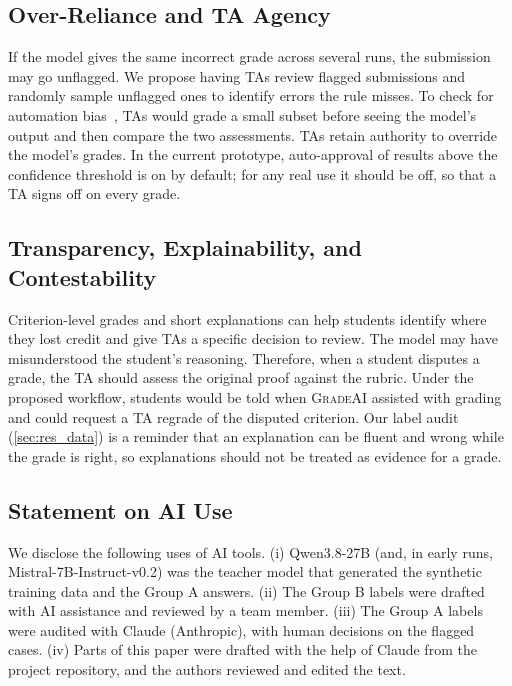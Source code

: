 \documentclass[11pt,a4paper]{article}
\newif\ifdraft
\newcommand{\todo}[2]{%
  \ifdraft\textcolor{red}{\textbf{[TODO #1:} #2\textbf{]}}\fi}
\newcommand{\gradeai}{\textsc{GradeAI}}
\theoremstyle{definition}
\begin{document}
\subsection{Over-Reliance and TA Agency}
If the model gives the same incorrect grade across several runs, the submission may go unflagged. We propose having TAs review flagged submissions and randomly sample unflagged ones to identify errors the rule misses. To check for automation bias~\cite{parasuraman2010complacency}, TAs would grade a small subset before seeing the model's output and then compare the two assessments. TAs retain authority to override the model's grades. In the current prototype, auto-approval of results above the confidence threshold is on by default; for any real use it should be off, so that a TA signs off on every grade.

\subsection{Transparency, Explainability, and Contestability}
Criterion-level grades and short explanations can help students identify where they lost credit and give TAs a specific decision to review. The model may have misunderstood the student's reasoning. Therefore, when a student disputes a grade, the TA should assess the original proof against the rubric. Under the proposed workflow, students would be told when \gradeai{} assisted with grading and could request a TA regrade of the disputed criterion. Our label audit (\cref{sec:res_data}) is a reminder that an explanation can be fluent and wrong while the grade is right, so explanations should not be treated as evidence for a grade.

\subsection{Statement on AI Use}\label{sec:ai_use}
We disclose the following uses of AI tools. (i) Qwen3.8-27B (and, in early runs, Mistral-7B-Instruct-v0.2) was the teacher model that generated the synthetic training data and the Group A answers. (ii) The Group B labels were drafted with AI assistance and reviewed by a team member. (iii) The Group A labels were audited with Claude (Anthropic), with human decisions on the flagged cases. (iv) Parts of this paper were drafted with the help of Claude from the project repository, and the authors reviewed and edited the text.
\todo{}{Complete this statement for every team member's use of AI tools in code and writing, per the CSC398 academic-integrity requirements, and confirm which teacher produced the final training data.}
\end{document}
